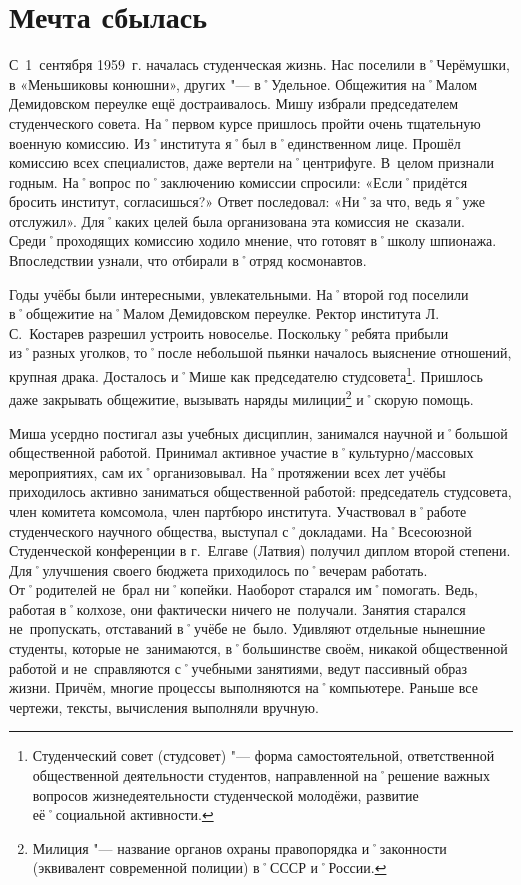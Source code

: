 ﻿\chapter{Мечта сбылась}

С~1~сентября 1959~г. началась студенческая жизнь. Нас поселили в˚Черёмушки, в «Меньшиковы конюшни», других "--- в˚Удельное. Общежития на˚Малом Демидовском переулке ещё достраивалось. Мишу избрали председателем студенческого совета. На˚первом курсе пришлось пройти очень тщательную военную комиссию. Из˚института я˚был в˚единственном лице. Прошёл комиссию всех специалистов, даже вертели на˚центрифуге. В~целом признали годным. На˚вопрос по˚заключению комиссии спросили: «Если˚придётся бросить институт, согласишься?» Ответ последовал: «Ни˚за что, ведь я˚уже отслужил». Для˚каких целей была организована эта комиссия не~сказали. Среди˚проходящих комиссию ходило мнение, что готовят в˚школу шпионажа. Впоследствии узнали, что отбирали в˚отряд космонавтов.

Годы учёбы были интересными, увлекательными. На˚второй год поселили в˚общежитие на˚Малом Демидовском переулке. Ректор института Л.\,С.~Костарев разрешил устроить новоселье. Поскольку˚ребята прибыли из˚разных уголков, то˚после небольшой пьянки началось выяснение отношений, крупная драка. Досталось и˚Мише как председателю студсовета\footnote{Студенческий совет (студсовет) "--- форма самостоятельной, ответственной общественной деятельности студентов, направленной на˚решение важных вопросов жизнедеятельности студенческой молодёжи, развитие её˚социальной активности.}. Пришлось даже закрывать общежитие, вызывать наряды милиции\footnote{Милиция "--- название органов охраны правопорядка и˚законности (эквивалент современной полиции) в˚СССР и˚России.} и˚скорую помощь.

Миша усердно постигал азы учебных дисциплин, занимался научной и˚большой общественной работой. Принимал активное участие в˚культурно\-/массовых мероприятиях, сам их˚организовывал. На˚протяжении всех лет учёбы приходилось активно заниматься общественной работой: председатель студсовета, член комитета комсомола, член партбюро института. Участвовал в˚работе студенческого научного общества, выступал с˚докладами. На˚Всесоюзной Студенческой конференции в г.~Елгаве (Латвия) получил диплом второй степени. Для˚улучшения своего бюджета приходилось по˚вечерам работать. От˚родителей не~брал ни˚копейки. Наоборот старался им˚помогать. Ведь, работая в˚колхозе, они фактически ничего не~получали. Занятия старался не~пропускать, отставаний в˚учёбе не~было. Удивляют отдельные нынешние студенты, которые не~занимаются, в˚большинстве своём, никакой общественной работой и не~справляются с˚учебными занятиями, ведут пассивный образ жизни. Причём, многие процессы выполняются на˚компьютере. Раньше все чертежи, тексты, вычисления выполняли вручную.

